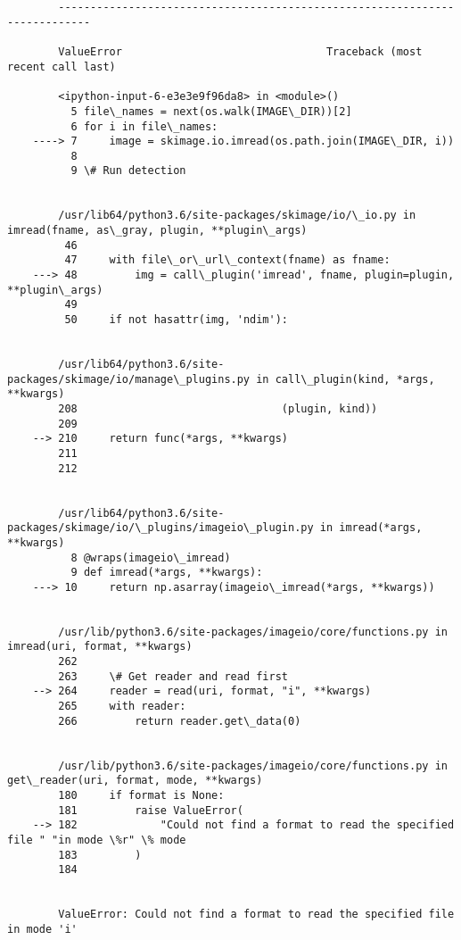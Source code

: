 \documentclass[11pt]{article}
\begin{document}
    \begin{center}
    \end{center}
    { \hspace*{\fill} \\}
    
    \begin{Verbatim}[commandchars=\\\{\}]

        ---------------------------------------------------------------------------

        ValueError                                Traceback (most recent call last)

        <ipython-input-6-e3e3e9f96da8> in <module>()
          5 file\_names = next(os.walk(IMAGE\_DIR))[2]
          6 for i in file\_names:
    ----> 7     image = skimage.io.imread(os.path.join(IMAGE\_DIR, i))
          8 
          9 \# Run detection


        /usr/lib64/python3.6/site-packages/skimage/io/\_io.py in imread(fname, as\_gray, plugin, **plugin\_args)
         46 
         47     with file\_or\_url\_context(fname) as fname:
    ---> 48         img = call\_plugin('imread', fname, plugin=plugin, **plugin\_args)
         49 
         50     if not hasattr(img, 'ndim'):


        /usr/lib64/python3.6/site-packages/skimage/io/manage\_plugins.py in call\_plugin(kind, *args, **kwargs)
        208                                (plugin, kind))
        209 
    --> 210     return func(*args, **kwargs)
        211 
        212 


        /usr/lib64/python3.6/site-packages/skimage/io/\_plugins/imageio\_plugin.py in imread(*args, **kwargs)
          8 @wraps(imageio\_imread)
          9 def imread(*args, **kwargs):
    ---> 10     return np.asarray(imageio\_imread(*args, **kwargs))
    

        /usr/lib/python3.6/site-packages/imageio/core/functions.py in imread(uri, format, **kwargs)
        262 
        263     \# Get reader and read first
    --> 264     reader = read(uri, format, "i", **kwargs)
        265     with reader:
        266         return reader.get\_data(0)


        /usr/lib/python3.6/site-packages/imageio/core/functions.py in get\_reader(uri, format, mode, **kwargs)
        180     if format is None:
        181         raise ValueError(
    --> 182             "Could not find a format to read the specified file " "in mode \%r" \% mode
        183         )
        184 


        ValueError: Could not find a format to read the specified file in mode 'i'

    \end{Verbatim}
\end{document}
